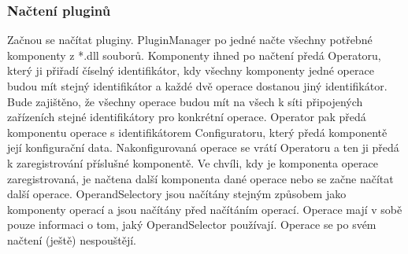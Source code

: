 \documentclass[12pt]{article}
\newcommand\nodegui{GraphicalUserInterface}
\newcommand\nodeui{UserInterface}
\newcommand\nodepm{PluginManager}
\newcommand\nodeconf{Configurator}
\newcommand\nodeo{Operator}
\newcommand\nodeoc{OperationCreator}
\newcommand\nodeop{OperationProcessor}
\newcommand\nodeci{CommunicationInterface}
\newcommand\nodeos{OperandSelector}
\newcommand\nodenm{NetworkCommunicator}
\newcommand\nodeml{MouseLogger}
\newcommand\nodekl{KeyLogger}
\newcommand\nodems{MouseSimulator}
\newcommand\nodeks{KeySimulator}
\newcommand\nodeses{ScreenEdgeSelector}
\begin{document}
\subsubsection{Načtení pluginů}
Začnou se načítat pluginy. PluginManager po jedné načte všechny potřebné komponenty z *.dll souborů. Komponenty ihned po načtení předá Operatoru, který ji přiřadí číselný identifikátor, kdy všechny komponenty jedné operace budou mít stejný identifikátor a každé dvě operace dostanou jiný identifikátor. Bude zajištěno, že všechny operace budou mít na všech k síti připojených zařízeních stejné identifikátory pro konkrétní operace. Operator pak předá komponentu operace s identifikátorem Configuratoru, který předá komponentě její konfigurační data. Nakonfigurovaná operace se vrátí Operatoru a ten ji předá k zaregistrování příslušné komponentě. Ve chvíli, kdy je komponenta operace zaregistrovaná, je načtena další komponenta dané operace nebo se začne načítat další operace. OperandSelectory jsou načítány stejným způsobem jako komponenty operací a jsou načítány před načítáním operací. Operace mají v sobě pouze informaci o tom, jaký OperandSelector používají.
Operace se po svém načtení (ještě) nespouštějí.
\begin{center}
\end{center}
\end{document}
